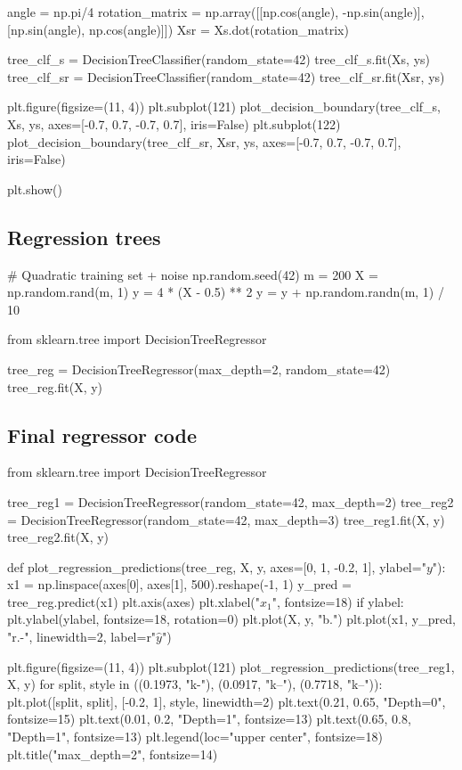 \documentclass[%
oneside,                 %
final,                   %
10pt]{article}
\begin{document}
angle = np.pi/4
rotation_matrix = np.array([[np.cos(angle), -np.sin(angle)], [np.sin(angle), np.cos(angle)]])
Xsr = Xs.dot(rotation_matrix)

tree_clf_s = DecisionTreeClassifier(random_state=42)
tree_clf_s.fit(Xs, ys)
tree_clf_sr = DecisionTreeClassifier(random_state=42)
tree_clf_sr.fit(Xsr, ys)

plt.figure(figsize=(11, 4))
plt.subplot(121)
plot_decision_boundary(tree_clf_s, Xs, ys, axes=[-0.7, 0.7, -0.7, 0.7], iris=False)
plt.subplot(122)
plot_decision_boundary(tree_clf_sr, Xsr, ys, axes=[-0.7, 0.7, -0.7, 0.7], iris=False)

plt.show()
\epycod

\subsection{Regression trees}
\bpycod
# Quadratic training set + noise
np.random.seed(42)
m = 200
X = np.random.rand(m, 1)
y = 4 * (X - 0.5) ** 2
y = y + np.random.randn(m, 1) / 10
\epycod

\bpycod
from sklearn.tree import DecisionTreeRegressor

tree_reg = DecisionTreeRegressor(max_depth=2, random_state=42)
tree_reg.fit(X, y)
\epycod

\subsection{Final regressor code}
\bpycod
from sklearn.tree import DecisionTreeRegressor

tree_reg1 = DecisionTreeRegressor(random_state=42, max_depth=2)
tree_reg2 = DecisionTreeRegressor(random_state=42, max_depth=3)
tree_reg1.fit(X, y)
tree_reg2.fit(X, y)

def plot_regression_predictions(tree_reg, X, y, axes=[0, 1, -0.2, 1], ylabel="$y$"):
    x1 = np.linspace(axes[0], axes[1], 500).reshape(-1, 1)
    y_pred = tree_reg.predict(x1)
    plt.axis(axes)
    plt.xlabel("$x_1$", fontsize=18)
    if ylabel:
        plt.ylabel(ylabel, fontsize=18, rotation=0)
    plt.plot(X, y, "b.")
    plt.plot(x1, y_pred, "r.-", linewidth=2, label=r"$\hat{y}$")

plt.figure(figsize=(11, 4))
plt.subplot(121)
plot_regression_predictions(tree_reg1, X, y)
for split, style in ((0.1973, "k-"), (0.0917, "k--"), (0.7718, "k--")):
    plt.plot([split, split], [-0.2, 1], style, linewidth=2)
plt.text(0.21, 0.65, "Depth=0", fontsize=15)
plt.text(0.01, 0.2, "Depth=1", fontsize=13)
plt.text(0.65, 0.8, "Depth=1", fontsize=13)
plt.legend(loc="upper center", fontsize=18)
plt.title("max_depth=2", fontsize=14)
\end{document}
